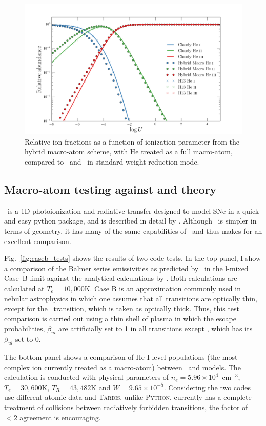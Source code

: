 \begin{figure}
\centering
\includegraphics[width=1.0\textwidth]{figures/03-radtrans/he_comp.png}
\caption{
Relative ion fractions as a function of ionization parameter from the
hybrid macro-atom scheme, with He treated as a full macro-atom, compared
to \cld\ and \py\ in standard weight reduction mode. 
}
\label{fig:he_cloudy}
\end{figure}


\subsection{Macro-atom testing against \tar and theory}

\tar\ is a 1D photoionization and radiative transfer designed to
model SNe in a quick and easy python package, and is described in detail by
\cite{kerzendorfsim}. Although \tar\ is simpler in terms
of geometry, it has many of the same capabilities of \py\ and 
thus makes for an excellent comparison. 

Fig.~\ref{fig:caseb_tests} shows the results of two code tests. 
In the top panel, I show a comparison of the Balmer series 
emissivities as predicted by \py\ in the l-mixed Case~B limit against the
analytical calculations by \cite{seaton1959}. 
Both calculations are calculated at $T_e=10,000$K.
Case B is an approximation commonly used in nebular astrophysics in which
one assumes that all transitions are optically thin, except
for the \la\ transition, which is taken as optically thick.
Thus, this test comparison is carried out using a thin shell
of plasma in which the escape probabilities, $\beta_{ul}$ 
are artificially set to 1 in all transitions except \la, which
has its $\beta_{ul}$ set to 0.

The bottom panel shows a comparison of He I level populations 
(the most complex ion currently 
treated as a macro-atom) between \py\ and \tar models.
The calculation is conducted with physical parameters of $n_e=5.96\times10^4$~cm$^{-3}$,
$T_e=30,600$K, $T_R=43,482$K and $W=9.65\times10^{-5}$. 
Considering the two codes use different atomic data and 
\textsc{Tardis,} unlike \textsc{Python,} currently has a 
complete treatment of collisions between 
radiatively forbidden transitions, the factor of 
$<2$ agreement is encouraging. 

